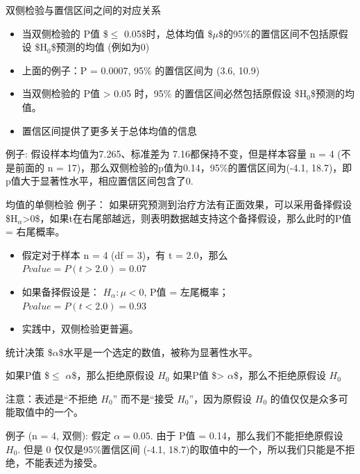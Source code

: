 \documentclass[presentation]{beamer}
\begin{document}
\begin{frame}[label={sec:orge29e3a1}]{双侧检验与置信区间之间的对应关系}
\begin{itemize}
\item 当双侧检验的 P值 \$\(\le\) 0.05\$时，总体均值 \$\(\mu\)\$的95\%的置信区间不包括原假设 \$H\(_{\text{0}}\)\$预测的均值 (例如为0)

\item 上面的例子：P = 0.0007, 95\% 的置信区间为  (3.6, 10.9)

\item 当双侧检验的 P值 > 0.05 时，95\% 的置信区间必然包括原假设 \$H\(_{\text{0}}\)\$预测的均值。

\item 置信区间提供了更多关于总体均值的信息
\end{itemize}

例子: 假设样本均值为7.265、标准差为 7.16都保持不变，但是样本容量 n = 4    (不是前面的 n = 17)，那么双侧检验的p值为0.14，95\%的置信区间为(-4.1, 18.7)，即p值大于显著性水平，相应置信区间包含了0.
\end{frame}
\begin{frame}[label={sec:orgff2a6b9}]{均值的单侧检验}
例子：
如果研究预测到治疗方法有正面效果，可以采用备择假设 \$H\(_{\alpha}\)>0\$，如果t在右尾部越远，则表明数据越支持这个备择假设，那么此时的P值 = 右尾概率。
\begin{itemize}
\item 假定对于样本 n = 4 (df = 3)，有 t = 2.0，那么 \(Pvalue = P(t > 2.0) = 0.07\)
\item 如果备择假设是： \(H_{\alpha}: \mu <0\),  P值 = 左尾概率； \(Pvalue = P(t < 2.0) = 0.93\)
\item 实践中，双侧检验更普遍。
\end{itemize}
\end{frame}

\begin{frame}[label={sec:org45e8c43}]{统计决策}
\$\(\alpha\)\$水平是一个选定的数值，被称为显著性水平。 

如果P值 \$\(\le\) \(\alpha\)\$，那么拒绝原假设 \(H_0\)
如果P值 \$> \(\alpha\)\$，那么不拒绝原假设 \(H_0\) 

注意：表述是“不拒绝 \(H_0\)” 而不是“接受 \(H_0\)”，因为原假设 \(H_0\)  的值仅仅是众多可能取值中的一个。

例子 (n = 4, 双侧): 假定 \(\alpha=0.05\). 由于 P值 =  0.14，那么我们不能拒绝原假设 \(H_0\).  但是 0 仅仅是95\%置信区间 (-4.1, 18.7)的取值中的一个，所以我们只能是不拒绝，不能表述为接受。
\end{frame}
\end{document}
